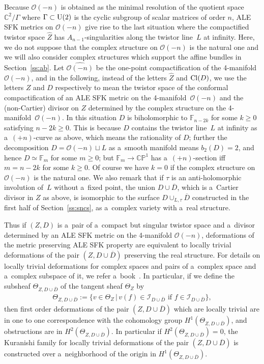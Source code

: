 \documentclass[11pt]{article}
\numberwithin{equation}{section}
\begin{document}
Because $\mathscr O(-n)$ is obtained as the minimal resolution of the quotient space $\mathbb{C}^2/\Gamma$ where
$\Gamma\subset{\rm{U}}(2)$ is the cyclic subgroup of scalar matrices of order $n$, ALE SFK metrics on $\mathscr O(-n)$
give rise to the last situation where the compactif\/ied twistor space $\hat Z$ has $A_{n-1}$-singularities along the
twistor line~$L$ at inf\/inity.
Here, we do not suppose that the complex structure on $\mathscr O(-n)$ is the natural one and we will also consider
complex structures which support the af\/f\/ine bundles in Section~\ref{ss:ab}.
Let $\widehat{\mathscr O(-n)}$ be the one-point compactif\/ication of the 4-manifold $\mathscr O(-n)$, and in the
following, instead of the letters $\hat Z$ and ${\rm{Cl}}(D)$, we use the letters $Z$ and $D$ respectively to mean the
twistor space of the conformal compactif\/ication of an ALE SFK metric on the 4-mani\-fold~$\mathscr O(-n)$ and the
(non-Cartier) divisor on $Z$ determined by the complex structure on the 4-mani\-fold~$\mathscr O(-n)$.
In this situation $D$ is biholomorphic to $\mathbb{F}_{n-2k}$ for some $k\ge 0$ satisfying $n-2k\ge 0$.
This is because $D$ contains the twistor line~$L$ at inf\/inity as a~$(+n)$-curve as above, which means the rationality
of $D$; further the decomposition $D=\mathscr O(-n)\sqcup L$ as a~smooth manifold means $b_2(D) = 2$, and hence
$D\simeq\mathbb{F}_m$ for some $m\ge 0$; but $\mathbb{F}_m\to\mathbb{CP}^1$ has a~$(+n)$-section if\/f $m=n-2k$ for some $k\ge0$.
Of course we have $k=0$ if the complex structure on $\mathscr O(-n)$ is the natural one.
We also remark that if $\tau$ is an anti-holomorphic involution of~$L$ without a~f\/ixed point, the union
$D\cup\overline D$, which is a~Cartier divisor in $Z$ as above, is isomorphic to the surface $D\cup_{L,\tau}\overline D$
constructed in the f\/irst half of Section~\ref{ss:sncs}, as a~complex variety with a~real structure.

Thus if $(Z,D)$ is a~pair of a~compact but singular twistor space and a~divisor determined by an ALE SFK metric on the
4-manifold $\mathscr O(-n)$, deformations of the metric preserving ALE SFK property are equivalent to locally trivial
deformations of the pair $(Z,D\cup\overline D)$ preserving the real structure.
For details on locally trivial deformations for complex spaces and pairs of a~complex space and a~complex subspace of
it, we refer a~book~\cite[Section~3.4]{SeBook}.
In particular, if we def\/ine the subsheaf $\Theta_{Z, D\cup\overline D}$ of the tangent sheaf $\Theta_Z$ by
\begin{gather*}
\Theta_{Z, D\cup\overline D}:=\big\{v\in \Theta_Z\,|\, v(f) \in \mathscr I_{D\cup\overline D}
\text{ if }
f\in \mathscr I_{D\cup\overline D}\big\},
\end{gather*}
then f\/irst order deformations of the pair $(Z,D\cup\overline D)$ which are locally trivial are in one to one
correspondence with the cohomology group $H^1(\Theta_{Z,D\cup\overline D})$, and obstructions are in
$H^2(\Theta_{Z,D\cup\overline D})$.
In particular if $H^2(\Theta_{Z,D\cup\overline D})=0$, the Kuranishi family for locally trivial deformations of the pair
$(Z, D\cup\overline D)$ is constructed over a~neighborhood of the origin in $H^1(\Theta_{Z,D\cup\overline D})$.
\end{document}

